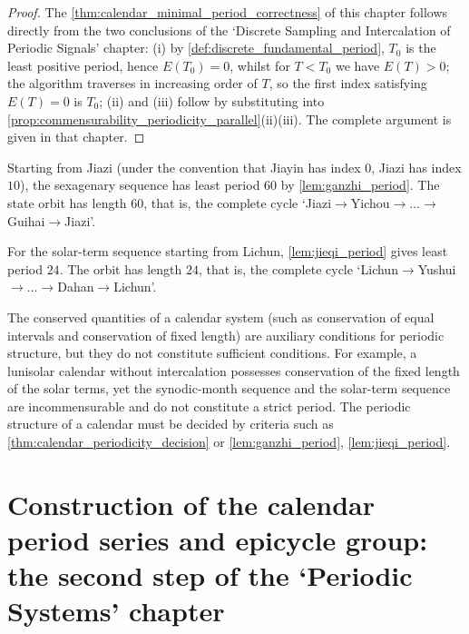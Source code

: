 \begin{proof}
The \cref{thm:calendar_minimal_period_correctness} of this chapter follows directly from the two conclusions of the `Discrete Sampling and Intercalation of Periodic Signals' chapter:
(i) by \cref{def:discrete_fundamental_period}, $T_0$ is the least positive period, hence $E(T_0)=0$, whilst for $T<T_0$ we have $E(T)>0$;
the algorithm traverses in increasing order of $T$, so the first index satisfying $E(T)=0$ is $T_0$;
(ii) and (iii) follow by substituting into \cref{prop:commensurability_periodicity_parallel}(ii)(iii). The complete argument is given in that chapter.
\end{proof}

\begin{example}\label{ex:calendar_ganzhi_period}
Starting from Jiazi (under the convention that Jiayin has index \(0\), Jiazi has index \(10\)), the sexagenary sequence has least period \(60\) by \cref{lem:ganzhi_period}. The state orbit has length \(60\), that is, the complete cycle `Jiazi$\to$Yichou$\to\dots\to$Guihai$\to$Jiazi'.
\end{example}

\begin{example}\label{ex:calendar_jieqi_period}
For the solar-term sequence starting from Lichun, \cref{lem:jieqi_period} gives least period \(24\). The orbit has length \(24\), that is, the complete cycle `Lichun$\to$Yushui$\to\dots\to$Dahan$\to$Lichun'.
\end{example}

\begin{remark}\label{rem:calendar_invariant_not_period}
The conserved quantities of a calendar system (such as conservation of equal intervals and conservation of fixed length) are auxiliary conditions for periodic structure, but they do not constitute sufficient conditions. For example, a lunisolar calendar without intercalation possesses conservation of the fixed length of the solar terms, yet the synodic-month sequence and the solar-term sequence are incommensurable and do not constitute a strict period. The periodic structure of a calendar must be decided by criteria such as \cref{thm:calendar_periodicity_decision} or \cref{lem:ganzhi_period}, \cref{lem:jieqi_period}.
\end{remark}

\section{Construction of the calendar period series and epicycle group: the second step of the `Periodic Systems' chapter}
\label{sec:calendar_series_construction}

